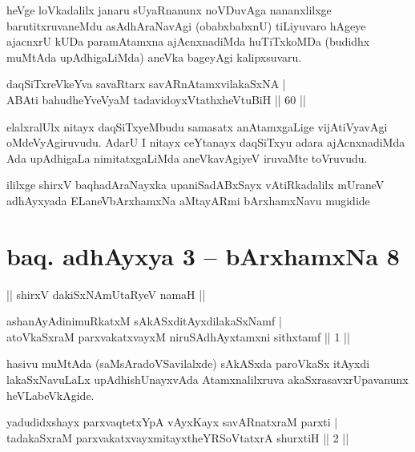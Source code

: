\begin{artha}
heVge loVkadalilx janaru sUyaRnanunx noVDuvAga nananxlilxge barutitxruva\-neMdu asAdhAraNavAgi (obabxbabxnU) tiLiyuvaro hAgeye ajacnxrU kUDa paramAtamxna ajAcnxnadiMda huTiTxkoMDa (budidhx muMtAda upAdhigaLiMda) aneVka bageyAgi kalipxsuvaru.
\end{artha}%


\begin{shl}
daqSiTxreVkeYva savaRtarx savARnAtamxvilakaSxNA |\\
ABAti bahudheYveVyaM tadavidoyxVtathxheVtuBiH \hfill || 60 ||
\end{shl}

\begin{artha}
elalxralUlx nitayx daqSiTxyeMbudu samasatx anAtamxgaLige vijAtiVyavAgi oMdeVyAgiruvudu. AdarU I nitayx ceYtanayx daqSiTxyu adara ajAcnxnadiMda Ada upAdhigaLa nimitatxgaLiMda aneVkavAgiyeV iruvaMte toVruvudu.
\end{artha}

\begin{center}
ililxge shirxV baqhadAraNayxka upaniSadABxSayx vAtiRkadalilx mUraneV adhAyxyada ELaneVbArxhamxNa aMtayARmi bArxhamxNavu mugidide
\end{center}

\section*{baq. adhAyxya 3 -- bArxhamxNa 8}

\begin{center}%
|| shirxV dakiSxNAmUtaRyeV namaH ||
\end{center}

\begin{shl}
ashanAyAdinimuRkatxM sAkASxditAyxdilakaSxNamf |\\
atoV\s kaSxraM parxvakatxvayxM niruSAdhAyxtamxni sithxtamf \hfill || 1 ||
\end{shl}

\begin{artha}
hasivu muMtAda (saMsAradoVSavilalxde) sAkASxda paroVkaSx itAyxdi lakaSxNavuLaLx upAdhishUnayxvAda Atamxnalilxruva akaSxrasavxrUpavanunx heVLabeVkAgide.
\end{artha}

\begin{shl}
yadudidxshayx parxvaqtetxYpA vAyxKayx savARnatxraM parxti |\\
tadakaSxraM parxvakatxvayxmitayxtheYRSoVtatxrA shurxtiH \hfill || 2 ||
\end{shl}

